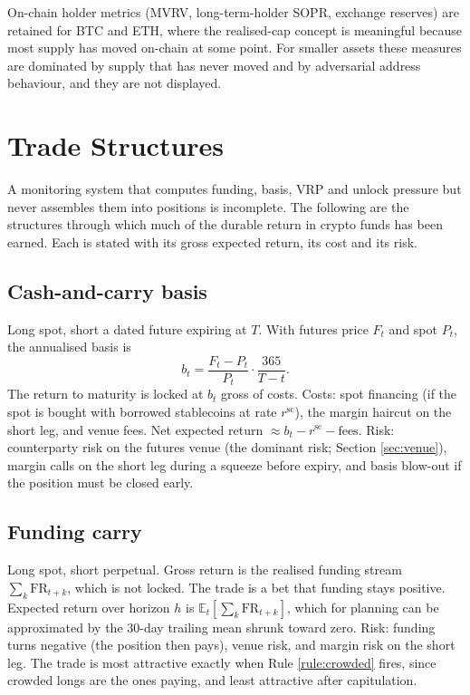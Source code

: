 \documentclass[11pt,a4paper]{article}
\theoremstyle{definition}
\newcommand{\E}{\mathbb{E}}
\begin{document}
On-chain holder metrics (MVRV, long-term-holder SOPR, exchange reserves) are retained for BTC and ETH, where the realised-cap concept is meaningful because most supply has moved on-chain at some point. For smaller assets these measures are dominated by supply that has never moved and by adversarial address behaviour, and they are not displayed.

\section{Trade Structures}\label{sec:trades}

A monitoring system that computes funding, basis, VRP and unlock pressure but never assembles them into positions is incomplete. The following are the structures through which much of the durable return in crypto funds has been earned. Each is stated with its gross expected return, its cost and its risk.

\subsection{Cash-and-carry basis}

Long spot, short a dated future expiring at $T$. With futures price $F_t$ and spot $P_t$, the annualised basis is
\begin{equation}
b_t = \frac{F_t - P_t}{P_t}\cdot\frac{365}{T - t}.
\end{equation}
The return to maturity is locked at $b_t$ gross of costs. Costs: spot financing (if the spot is bought with borrowed stablecoins at rate $r^{\mathrm{sc}}$), the margin haircut on the short leg, and venue fees. Net expected return $\approx b_t - r^{\mathrm{sc}} - \mathrm{fees}$. Risk: counterparty risk on the futures venue (the dominant risk; Section \ref{sec:venue}), margin calls on the short leg during a squeeze before expiry, and basis blow-out if the position must be closed early.

\subsection{Funding carry}

Long spot, short perpetual. Gross return is the realised funding stream $\sum_k \mathrm{FR}_{t+k}$, which is not locked. The trade is a bet that funding stays positive. Expected return over horizon $h$ is $\E_t[\sum_k \mathrm{FR}_{t+k}]$, which for planning can be approximated by the 30-day trailing mean shrunk toward zero. Risk: funding turns negative (the position then pays), venue risk, and margin risk on the short leg. The trade is most attractive exactly when Rule \ref{rule:crowded} fires, since crowded longs are the ones paying, and least attractive after capitulation.
\end{document}
